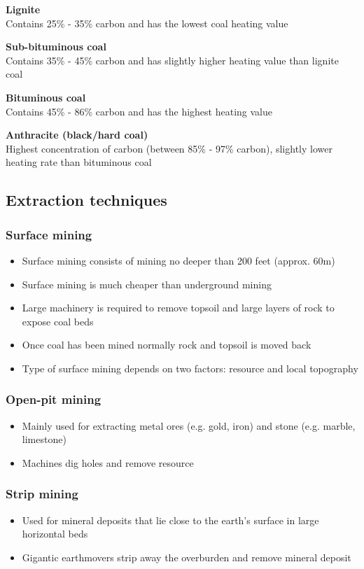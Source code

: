 \documentclass{article}
\begin{document}
\textbf{Lignite}\\
Contains 25\% - 35\% carbon and has the lowest coal heating value

\textbf{Sub-bituminous coal}\\
Contains 35\% - 45\% carbon and has slightly higher heating value than lignite coal

\textbf{Bituminous coal}\\
Contains 45\% - 86\% carbon and has the highest heating value

\textbf{Anthracite (black/hard coal)}\\
Highest concentration of carbon (between 85\% - 97\% carbon),
slightly lower heating rate than bituminous coal

\subsection{Extraction techniques}
\subsubsection{Surface mining}
\begin{itemize}
    \item Surface mining consists of mining no deeper than 200 feet (approx. 60m)
    \item Surface mining is much cheaper than underground mining
    \item Large machinery is required to remove topsoil and large layers of rock to expose coal beds
    \item Once coal has been mined normally rock and topsoil is moved back
    \item Type of surface mining depends on two factors: resource and local topography
\end{itemize}

\subsubsection{Open-pit mining}
\begin{itemize}
    \item Mainly used for extracting metal ores (e.g. gold, iron) and stone (e.g. marble, limestone)
    \item Machines dig holes and remove resource
\end{itemize}

\subsubsection{Strip mining}
\begin{itemize}
    \item Used for mineral deposits that lie close to the earth’s surface in large horizontal beds
    \item Gigantic earthmovers strip away the overburden and remove mineral deposit
\end{itemize}
\end{document}
